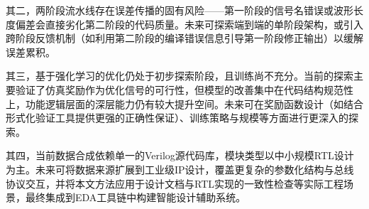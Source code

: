 其二，两阶段流水线存在误差传播的固有风险——第一阶段的信号名错误或波形长度偏差会直接劣化第二阶段的代码质量。未来可探索端到端的单阶段架构，或引入跨阶段反馈机制（如利用第二阶段的编译错误信息引导第一阶段修正输出）以缓解误差累积。

其三，基于强化学习的优化仍处于初步探索阶段，且训练尚不充分。当前的探索主要验证了仿真奖励作为优化信号的可行性，但模型的改善集中在代码结构规范性上，功能逻辑层面的深层能力仍有较大提升空间。未来可在奖励函数设计（如结合形式化验证工具提供更强的正确性保证）、训练策略与规模等方面进行更深入的探索。

其四，当前数据合成依赖单一的Verilog源代码库，模块类型以中小规模RTL设计为主。未来可将数据来源扩展到工业级IP设计，覆盖更复杂的参数化结构与总线协议交互，并将本文方法应用于设计文档与RTL实现的一致性检查等实际工程场景，最终集成到EDA工具链中构建智能设计辅助系统。
